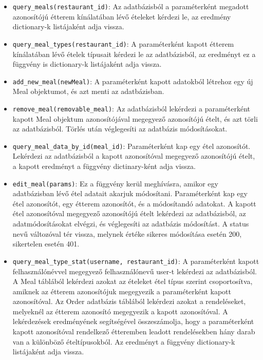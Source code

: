 \begin{itemize}
    \item \texttt{query\_meals(restaurant\_id)}:
        Az adatbázisból a paraméterként megadott azonosítójú étterem kínálatában lévő ételeket kérdezi le, az eredmény dictionary-k listájaként adja vissza.
    \item \texttt{query\_meal\_types(restaurant\_id)}:
        A paraméterként kapott étterem kínálatában lévő ételek típusait kérdezi le az adatbázisból, az eredményt ez a függvény is dictionary-k listájaként adja vissza.
    \item \texttt{add\_new\_meal(newMeal)}:
        A paraméterként kapott adatokból létrehoz egy új Meal objektumot, és azt menti az adatbázisban.
    \item \texttt{remove\_meal(removable\_meal)}:
        Az adatbázisból lekérdezi a paraméterként kapott Meal objektum azonosítójával megegyező azonosítójú ételt, és azt törli az adatbázisból. Törlés után véglegesíti az adatbázis módosításokat.
    \item \texttt{query\_meal\_data\_by\_id(meal\_id)}:
        Paraméterként kap egy étel azonosítót. Lekérdezi az adatbázisból a kapott azonosítóval megegyező azonosítójú ételt, a kapott eredményt a függvény dictinary-ként adja vissza.
    \item \texttt{edit\_meal(params)}:
        Ez a függvény kerül meghívásra, amikor egy adatbázisban lévő étel adatait akarjuk módosítani. Paraméterként kap egy étel azonosítót, egy étterem azonosítót, és a módosítandó adatokat. A kapott étel azonosítóval megegyező azonosítójú ételt lekérdezi az adatbázisból, az adatmódosításokat elvégzi, és véglegesíti az adatbázis módosítást. A status nevű változóval tér vissza, melynek értéke sikeres módosítása esetén 200, sikertelen esetén 401.
    \item \texttt{query\_meal\_type\_stat(username, restaurant\_id)}:
        A paraméterként kapott felhasználónévvel megegyező felhasználónevű user-t lekérdezi az adatbázisból. A Meal táblából lekérdezi azokat az ételeket étel típus szerint csoportosítva, amiknek az étterem azonosítójuk megegyezik a paraméterként kapott azonosítóval. Az Order adatbázis táblából lekérdezi azokat a rendeléseket, melyeknél az étterem azonosító megegyezik a kapott azonosítóval. A lekérdezések eredményének segítségével összeszámolja, hogy a paraméterként kapott azonosítóval rendelkező étteremben leadott rendelésekben hány darab van a különböző ételtípusokból. Az eredményt a függvény dictionary-k listájaként adja vissza.
\end{itemize}

